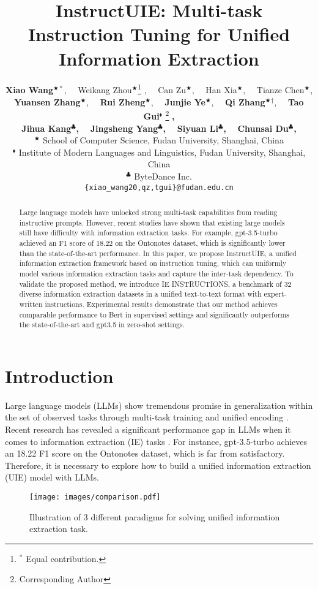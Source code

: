 \documentclass[11pt]{article}
\title{InstructUIE: Multi-task Instruction Tuning for Unified Information Extraction}
\author{
    {\normalsize
     \textbf{Xiao Wang}$^{\bigstar*}$, 
     \ \ Weikang Zhou$^{\bigstar}$\thanks{$^*$  Equal contribution.} ,
     \ \ Can Zu$^{\bigstar}$, 
     \ \ Han Xia$^{\bigstar}$, 
     \ \ Tianze Chen$^{\bigstar}$,}\\
    {\normalsize
     \textbf{Yuansen Zhang}$^{\bigstar}$, 
    \ \ \textbf{Rui Zheng}$^{\bigstar}$, 
    \ \ \textbf{Junjie Ye}$^{\bigstar}$, 
    \ \ \textbf{Qi Zhang}$^{\bigstar}$$^{\dagger}$,
    \ \ \textbf{Tao Gui}$^{\blacklozenge}$
    \thanks{{} {} Corresponding Author} 
    \textbf{,}
    }\\
    {\normalsize
    \textbf{Jihua Kang}$^{\clubsuit}$\textbf{,} 
    \ \ \textbf{Jingsheng Yang}$^{\clubsuit}$\textbf{,} 
    \ \ \textbf{Siyuan Li}$^{\clubsuit}$\textbf{,} 
    \ \ \textbf{Chunsai Du}$^{\clubsuit}$\textbf{,}
    }\\
  {$^\bigstar$ \normalsize School of Computer Science, Fudan University, Shanghai, China} \\
  {$^\blacklozenge$ \normalsize Institute of Modern Languages and Linguistics, Fudan University, Shanghai, China} \\
  {$^\clubsuit$ \normalsize ByteDance Inc.} \\
  \texttt{\normalsize \{xiao\_wang20,qz,tgui\}@fudan.edu.cn}
}
\begin{document}
\maketitle
\begin{abstract}


Large language models have unlocked strong multi-task capabilities from reading instructive prompts.
However, recent studies have shown that existing large models still have difficulty with information extraction tasks. 
For example, gpt-3.5-turbo achieved an F1 score of 18.22 on the Ontonotes dataset, which is significantly lower than the state-of-the-art performance.
In this paper, we propose InstructUIE, a unified information extraction framework based on instruction tuning, which can uniformly model various information extraction tasks and capture the inter-task dependency.
To validate the proposed method, we introduce IE INSTRUCTIONS, a benchmark of 32 diverse information extraction datasets in a unified text-to-text format with expert-written instructions.
Experimental results demonstrate that our method achieves comparable performance to Bert in supervised settings and significantly outperforms the state-of-the-art and gpt3.5 in zero-shot settings.

\end{abstract}

\section{Introduction}

Large language models (LLMs) \cite{Brown2020LanguageMA,InstructGPT,GPT4} show tremendous promise in generalization within the set of observed tasks through multi-task training and unified encoding \cite{mishra-etal-2022-cross,wang-etal-2022-super,Longpre2023TheFC}. 
Recent research has revealed a significant performance gap in LLMs when it comes to information extraction (IE) tasks \cite{ye2023comprehensive,chen2023robust}. 
For instance, gpt-3.5-turbo achieves an 18.22 F1 score on the Ontonotes dataset, which is far from satisfactory. 
Therefore, it is necessary to explore how to build a unified information extraction (UIE) model with LLMs.

\begin{figure}[t]
\small
\centering
  \texttt{[image: images/comparison.pdf]}
  \caption{Illustration of 3 different paradigms for solving unified information extraction task.}
 \label{comparison}
\end{figure}
\end{document}
